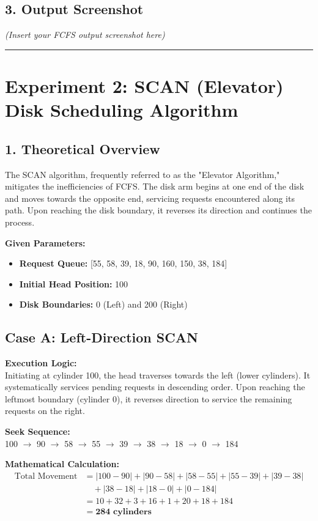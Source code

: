 \documentclass[12pt,a4paper]{article}
\begin{document}
\subsection*{3. Output Screenshot}
\textit{(Insert your FCFS output screenshot here)}

\vspace{0.5cm}
\hrule
\vspace{0.5cm}

\section*{Experiment 2: SCAN (Elevator) Disk Scheduling Algorithm}

\subsection*{1. Theoretical Overview}
The SCAN algorithm, frequently referred to as the "Elevator Algorithm," mitigates the inefficiencies of FCFS. The disk arm begins at one end of the disk and moves towards the opposite end, servicing requests encountered along its path. Upon reaching the disk boundary, it reverses its direction and continues the process.

\textbf{Given Parameters:}
\begin{itemize}
    \item \textbf{Request Queue:} [55, 58, 39, 18, 90, 160, 150, 38, 184]
    \item \textbf{Initial Head Position:} 100
    \item \textbf{Disk Boundaries:} 0 (Left) and 200 (Right)
\end{itemize}

\subsection*{Case A: Left-Direction SCAN}
\textbf{Execution Logic:} \\
Initiating at cylinder 100, the head traverses towards the left (lower cylinders). It systematically services pending requests in descending order. Upon reaching the leftmost boundary (cylinder 0), it reverses direction to service the remaining requests on the right.

\textbf{Seek Sequence:} \\
100 $\rightarrow$ 90 $\rightarrow$ 58 $\rightarrow$ 55 $\rightarrow$ 39 $\rightarrow$ 38 $\rightarrow$ 18 $\rightarrow$ 0 $\rightarrow$ 184

\textbf{Mathematical Calculation:}
\begin{align*}
\text{Total Movement} &= |100 - 90| + |90 - 58| + |58 - 55| + |55 - 39| + |39 - 38| \\
&\quad + |38 - 18| + |18 - 0| + |0 - 184| \\
&= 10 + 32 + 3 + 16 + 1 + 20 + 18 + 184 \\
&= \mathbf{284 \text{ cylinders}}
\end{align*}
\end{document}
